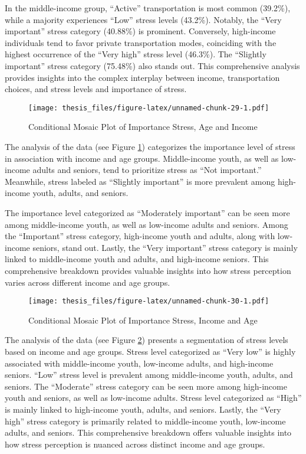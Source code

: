 \documentclass[
11pt, %
oneside, %
english, %
singlespacing, %
]{macthesis} %
\begin{document}
In the middle-income group, ``Active'' transportation is most common (39.2\%), while a majority experiences ``Low'' stress levels (43.2\%). Notably, the ``Very important'' stress category (40.88\%) is prominent. Conversely, high-income individuals tend to favor private transportation modes, coinciding with the highest occurrence of the ``Very high'' stress level (46.3\%). The ``Slightly important'' stress category (75.48\%) also stands out. This comprehensive analysis provides insights into the complex interplay between income, transportation choices, and stress levels and importance of stress.
\begin{figure}
\centering
\texttt{[image: thesis\_files/figure-latex/unnamed-chunk-29-1.pdf]}
\caption{\label{fig:unnamed-chunk-29}\label{fig:Income Age and importance of stress}Conditional Mosaic Plot of Importance Stress, Age and Income}
\end{figure}
The analysis of the data (see Figure \ref{fig:Income Age and importance of stress}) categorizes the importance level of stress in association with income and age groups. Middle-income youth, as well as low-income adults and seniors, tend to prioritize stress as ``Not important.'' Meanwhile, stress labeled as ``Slightly important'' is more prevalent among high-income youth, adults, and seniors.

The importance level categorized as ``Moderately important'' can be seen more among middle-income youth, as well as low-income adults and seniors. Among the ``Important'' stress category, high-income youth and adults, along with low-income seniors, stand out. Lastly, the ``Very important'' stress category is mainly linked to middle-income youth and adults, and high-income seniors. This comprehensive breakdown provides valuable insights into how stress perception varies across different income and age groups.
\begin{figure}
\centering
\texttt{[image: thesis\_files/figure-latex/unnamed-chunk-30-1.pdf]}
\caption{\label{fig:unnamed-chunk-30}\label{fig:Income-Age-stress}Conditional Mosaic Plot of Importance Stress, Income and Age}
\end{figure}
The analysis of the data (see Figure \ref{fig:Income-Age-stress}) presents a segmentation of stress levels based on income and age groups. Stress level categorized as ``Very low'' is highly associated with middle-income youth, low-income adults, and high-income seniors. ``Low'' stress level is prevalent among middle-income youth, adults, and seniors. The ``Moderate'' stress category can be seen more among high-income youth and seniors, as well as low-income adults. Stress level categorized as ``High'' is mainly linked to high-income youth, adults, and seniors. Lastly, the ``Very high'' stress category is primarily related to middle-income youth, low-income adults, and seniors. This comprehensive breakdown offers valuable insights into how stress perception is nuanced across distinct income and age groups.
\end{document}
